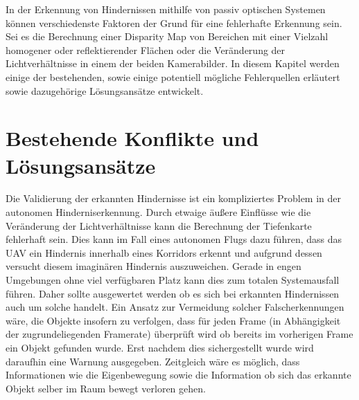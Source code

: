 In der Erkennung von Hindernissen mithilfe von passiv optischen Systemen können verschiedenste Faktoren der Grund für eine fehlerhafte Erkennung sein. Sei es die Berechnung einer Disparity Map von Bereichen mit einer Vielzahl homogener oder reflektierender Flächen oder die Veränderung der Lichtverhältnisse in einem der beiden Kamerabilder. In diesem Kapitel werden einige der bestehenden, sowie einige potentiell mögliche Fehlerquellen erläutert sowie dazugehörige Lösungsansätze entwickelt.\\


\section{Bestehende Konflikte und Lösungsansätze}
\label{sec:existing_conflicts}

Die Validierung der erkannten Hindernisse ist ein kompliziertes Problem in der autonomen Hinderniserkennung. Durch etwaige äußere Einflüsse wie die Veränderung der Lichtverhältnisse kann die Berechnung der Tiefenkarte fehlerhaft sein. Dies kann im Fall eines autonomen Flugs dazu führen, dass das UAV ein Hindernis innerhalb eines Korridors erkennt und aufgrund dessen versucht diesem imaginären Hindernis auszuweichen. Gerade in engen Umgebungen ohne viel verfügbaren Platz kann dies zum totalen Systemausfall führen. Daher sollte ausgewertet werden ob es sich bei erkannten Hindernissen auch um solche handelt. Ein Ansatz zur Vermeidung solcher Falscherkennungen wäre, die Objekte insofern zu verfolgen, dass für jeden Frame (in Abhängigkeit der zugrundeliegenden Framerate) überprüft wird ob bereits im vorherigen Frame ein Objekt gefunden wurde. Erst nachdem dies sichergestellt wurde wird daraufhin eine Warnung ausgegeben. Zeitgleich wäre es möglich, dass Informationen wie die Eigenbewegung sowie die Information ob sich das erkannte Objekt selber im Raum bewegt verloren gehen.\\

